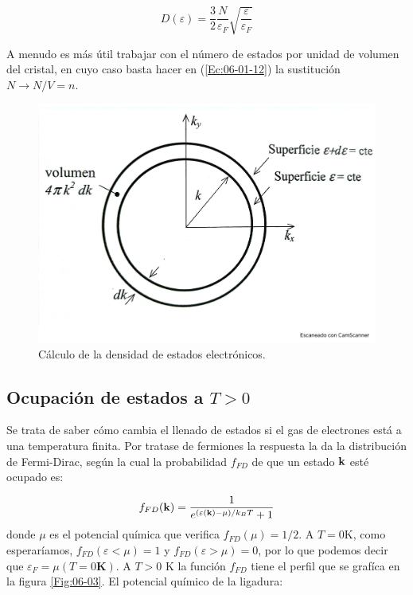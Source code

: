 \begin{equation}
	D(\varepsilon) = \frac{3}{2} \frac{N}{\varepsilon_F} \sqrt{\frac{\varepsilon}{\varepsilon_F}} \label{Ec:06-01-11}
\end{equation}	

A menudo es más útil trabajar con el número de estados por unidad de volumen del cristal, en cuyo caso basta hacer en (\ref{Ec:06-01-12}) la sustitución $N\rightarrow N/V=n$.
	
\begin{figure}[h!] \centering
    \includegraphics[scale=0.35]{Cuerpo/Ch_06/Fotos libro 2.pdf}
    \caption{Cálculo de la densidad de estados electrónicos.}
    \label{Fig:06-02}
\end{figure}  

\subsection{Ocupación de estados a $T>0$}

Se trata de saber cómo cambia el llenado de estados si el gas de electrones está a una temperatura finita. Por tratase de fermiones la respuesta la da la distribución de Fermi-Dirac, según la cual la probabilidad $f_{FD}$ de que un estado $\mathbf{k}$ esté ocupado es:

\begin{equation}
	f_{FD} (\mathbf{k}) = \frac{1}{e^{(\varepsilon(\mathbf{k})-\mu)/k_B T} +1}  \label{Ec:06-01-13}
\end{equation}
donde $\mu$ es el potencial química que verifica $f_{FD}(\mu)=1/2$. A $T=0$K, como esperaríamos, $f_{FD}(\varepsilon<\mu)=1$ y $f_{FD}(\varepsilon>\mu)=0$, por lo que podemos decir que $\varepsilon_F=\mu(T=0\textbf{K})$. A $T>0$ K la función $f_{FD}$ tiene el perfil que se grafíca en la figura \ref{Fig:06-03}. El potencial químico de la ligadura:

